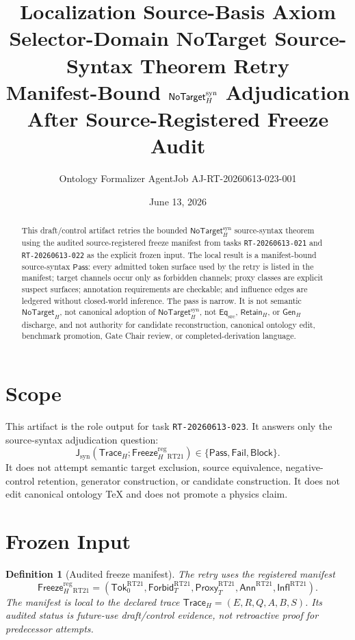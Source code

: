 \documentclass[11pt]{article}
\title{\textbf{Localization Source-Basis Axiom Selector-Domain NoTarget Source-Syntax Theorem Retry}\\[0.35em]
\large Manifest-Bound \(\NoTargetSyn\) Adjudication After Source-Registered Freeze Audit}
\author{Ontology Formalizer AgentJob AJ-RT-20260613-023-001}
\date{June 13, 2026}
\newcommand{\GenH}{\mathsf{Gen}_{H}}
\newcommand{\EqSrc}{\mathsf{Eq}_{\mathrm{src}}}
\newcommand{\RetainH}{\mathsf{Retain}_{H}}
\newcommand{\NoTargetH}{\mathsf{NoTarget}_{H}}
\newcommand{\NoTargetSyn}{\mathsf{NoTarget}_{H}^{\mathrm{syn}}}
\newcommand{\SrcTok}{\mathsf{Tok}_{0}}
\newcommand{\ForbidT}{\mathsf{Forbid}_{T}}
\newcommand{\ProxyT}{\mathsf{Proxy}_{T}}
\newcommand{\TraceH}{\mathsf{Trace}_{H}}
\newcommand{\Annot}{\mathsf{Ann}}
\newcommand{\Influence}{\mathsf{Infl}}
\newcommand{\FreezeH}{\mathsf{Freeze}_{H}}
\newcommand{\JudgeSyn}{\mathsf{J}_{\mathrm{syn}}}
\newcommand{\Pass}{\mathsf{Pass}}
\newcommand{\Fail}{\mathsf{Fail}}
\newcommand{\Block}{\mathsf{Block}}
\newtheorem{definitionblock}{Definition}
\begin{document}
\maketitle

\begin{abstract}
This draft/control artifact retries the bounded
\(\NoTargetSyn\) source-syntax theorem using the audited
source-registered freeze manifest from tasks \texttt{RT-20260613-021} and
\texttt{RT-20260613-022} as the explicit frozen input. The local result is
a manifest-bound source-syntax \(\Pass\): every admitted token surface used
by the retry is listed in the manifest; target channels occur only as
forbidden channels; proxy classes are explicit suspect surfaces; annotation
requirements are checkable; and influence edges are ledgered without
closed-world inference. The pass is narrow. It is not semantic
\(\NoTargetH\), not canonical adoption of \(\NoTargetSyn\), not
\(\EqSrc\), \(\RetainH\), or \(\GenH\) discharge, and not authority for
candidate reconstruction, canonical ontology edit, benchmark promotion,
Gate Chair review, or completed-derivation language.
\end{abstract}

\section{Scope}

This artifact is the role output for task \texttt{RT-20260613-023}. It
answers only the source-syntax adjudication question:
\[
    \JudgeSyn(\TraceH;\FreezeH^{\mathrm{reg}}_{\mathrm{RT21}})
    \in \{\Pass,\Fail,\Block\}.
\]
It does not attempt semantic target exclusion, source equivalence,
negative-control retention, generator construction, or candidate
construction. It does not edit canonical ontology TeX and does not promote a
physics claim.

\section{Frozen Input}

\begin{definitionblock}[Audited freeze manifest]
The retry uses the registered manifest
\[
    \FreezeH^{\mathrm{reg}}_{\mathrm{RT21}} =
    (\SrcTok^{\mathrm{RT21}},\ForbidT^{\mathrm{RT21}},
    \ProxyT^{\mathrm{RT21}},\Annot^{\mathrm{RT21}},
    \Influence^{\mathrm{RT21}}).
\]
The manifest is local to the declared trace
\(\TraceH=(E,R,Q,A,B,S)\). Its audited status is future-use
draft/control evidence, not retroactive proof for predecessor attempts.
\end{definitionblock}
\end{document}
